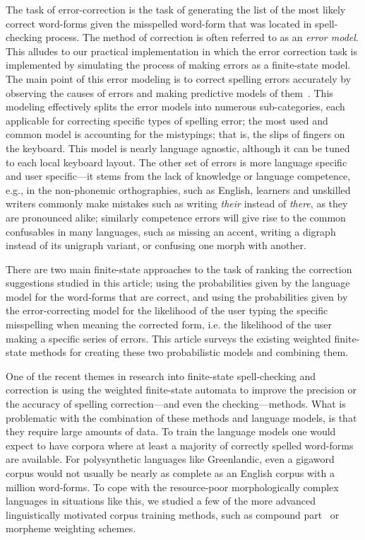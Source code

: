 \documentclass[a4paper,12pt]{article}
\begin{document}
The task of error-correction is the task of generating the list of the most
likely correct word-forms given the misspelled word-form that was located in
spell-checking process. The method of correction is often referred to as an
\emph{error model}. This alludes to our practical implementation in which the
error correction task is implemented by simulating the process of making errors
as a finite-state model. The main point of this error modeling is to correct
spelling errors accurately by observing the causes of errors and making
predictive models of them~\cite[]{deorowicz2005correcting}. This modeling
effectively splits the error models into numerous sub-categories, each
applicable for correcting specific types of spelling error; the most used and
common model is accounting for the mistypings; that is, the slips of fingers on
the keyboard. This model is nearly language agnostic, although it can be tuned
to each local keyboard layout. The other set of errors is more language
specific and user specific---it stems from the lack of knowledge or language
competence, e.g., in the non-phonemic orthographies, such as English,
learners and unskilled writers commonly make mistakes such as writing
\emph{their} instead of \emph{there}, as they are pronounced alike; similarly
competence errors will give rise to the common confusables in many languages,
such as missing an accent, writing a digraph instead of its unigraph variant,
or confusing one morph with another.

There are two main finite-state approaches to the task of ranking the
correction suggestions studied in this article; using the probabilities given
by the language model for the word-forms that are correct, and using the
probabilities given by the error-correcting model for the likelihood of the
user typing the specific misspelling when meaning the corrected form, i.e. the
likelihood of the user making a specific series of errors. This article surveys
the existing weighted finite-state methods for creating these two probabilistic
models and combining them.

One of the recent themes in research into finite-state spell-checking and
correction is using the weighted finite-state automata to improve the precision
or the accuracy of spelling correction---and even the checking---methods.
What is problematic with the combination of these methods and language models,
is that they require large amounts of data. To train the language models one
would expect to have corpora where at least a majority of correctly spelled
word-forms are available. For polysynthetic languages like Greenlandic, even
a gigaword corpus would not usually be nearly as complete as an English corpus
with a million word-forms. To cope with the resource-poor morphologically
complex languages in situations like this, we studied a few of the more
advanced linguistically motivated corpus training methods, such as compound
part~\cite[]{pirinen/2009/nodalida} or morpheme weighting schemes.
\end{document}
